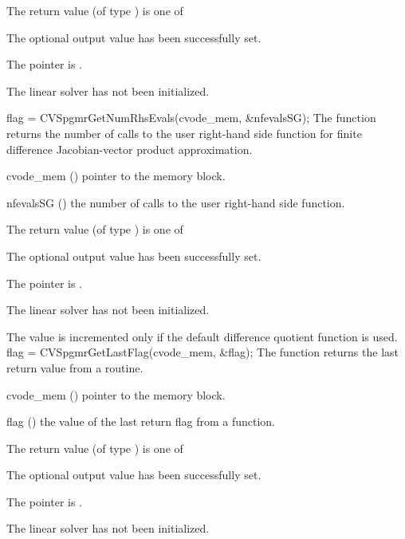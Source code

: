 {
  The return value  (of type ) is one of
  \begin{args}
  \item[\Id{CVSPGMR\_SUCCESS}] 
    The optional output value has been successfully set.
  \item[\Id{CVSPGMR\_MEM\_NULL}]
    The  pointer is .
  \item[\Id{CVSPGMR\_LMEM\_NULL}]
    The {\cvspgmr} linear solver has not been initialized.
  \end{args}
}
{}
{
  flag = CVSpgmrGetNumRhsEvals(cvode\_mem, \&nfevalsSG);
}
{
  The function  returns the
  number of calls to the user right-hand side function for
  finite difference Jacobian-vector product approximation.
}
{
  \begin{args}
  \item[cvode\_mem] ()
    pointer to the {\cvode} memory block.
  \item[nfevalsSG] ()
    the number of calls to the user right-hand side function.
  \end{args}
}
{
  The return value  (of type ) is one of
  \begin{args}
  \item[\Id{CVSPGMR\_SUCCESS}] 
    The optional output value has been successfully set.
  \item[\Id{CVSPGMR\_MEM\_NULL}]
    The  pointer is .
  \item[\Id{CVSPGMR\_LMEM\_NULL}]
    The {\cvspgmr} linear solver has not been initialized.
  \end{args}
}
{
  The value  is incremented only if the default 
   difference quotient function is used.
}
{
  flag = CVSpgmrGetLastFlag(cvode\_mem, \&flag);
}
{
  The function  returns the
  last return value from a {\cvspgmr} routine. 
}
{
  \begin{args}
  \item[cvode\_mem] ()
    pointer to the {\cvode} memory block.
  \item[flag] ()
    the value of the last return flag from a {\cvspgmr} function.
  \end{args}
}
{
  The return value  (of type ) is one of
  \begin{args}
  \item[\Id{CVSPGMR\_SUCCESS}] 
    The optional output value has been successfully set.
  \item[\Id{CVSPGMR\_MEM\_NULL}]
    The  pointer is .
  \item[\Id{CVSPGMR\_LMEM\_NULL}]
    The {\cvspgmr} linear solver has not been initialized.
  \end{args}
}
